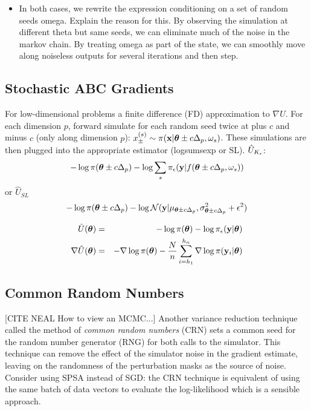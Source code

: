 \documentclass[]{article}
\begin{document}
\begin{itemize}
  \item In both cases, we rewrite the expression conditioning on a set of random seeds omega.  Explain the reason for this.  By observing the simulation at different theta but same seeds, we can eliminate much of the noise in the markov chain.  By treating omega as part of the state, we can smoothly move along noiseless outputs for several iterations and then step.
\end{itemize}

\subsection{Stochastic ABC Gradients}
For low-dimensional problems a finite difference (FD) approximation to $\nabla U$.  For each dimension $p$, forward simulate for each random seed twice at plus $c$ and minus $c$ (only along dimension $p$): $x_{\pm}^{(s)} \sim \pi( {\bf x} | {\bm \theta} \pm c \Delta_p, \omega_s)$.  These simulations are then plugged into the appropriate estimator (logsumsexp or SL).  $\hat{U}_{K_{\epsilon}}$:
\begin{eqnarray}
  - \log \pi({\bm \theta} \pm c \Delta_p) - \log \sum_s \pi_{\epsilon}({\bf y} | f( {\bm \theta} \pm c \Delta_p, \omega_s ) )
\end{eqnarray}   
or $\hat{U}_{SL}$
\begin{eqnarray}
  - \log \pi({\bm \theta} \pm c \Delta_p) - \log \mathcal{N}({\bf y} | \mu_{{\bm \theta} \pm c \Delta_p}, \sigma^2_{{\bm \theta} \pm c \Delta_p} + \epsilon^2 )
\end{eqnarray}


\begin{eqnarray}
  \hat{U}({\bm \theta})       & = & - \log \pi({\bm \theta}) - \log \pi_{\epsilon}({\bf y} | {\bm \theta} ) \\
  \nabla\hat{U}({\bm \theta}) & = & - \nabla \log \pi({\bm \theta}) - \frac{N}{n} \sum_{i=h_1}^{h_n} \nabla \log \pi({\bf y}_i | {\bm \theta} ) 
\end{eqnarray} 

\subsection{Common Random Numbers}

[CITE NEAL How to view an MCMC...]
Another variance reduction technique called the method of {\em common random numbers} (CRN) \cite{kleinman1999simulation} sets a common seed for the random number generator (RNG) for both calls to the simulator.  This technique can remove the effect of the simulator noise in the gradient estimate, leaving on the randomness of the perturbation masks as the source of noise. Consider using SPSA instead of SGD: the CRN technique is equivalent of using the same batch of data vectors to evaluate the log-likelihood which is a sensible approach.
\end{document}
